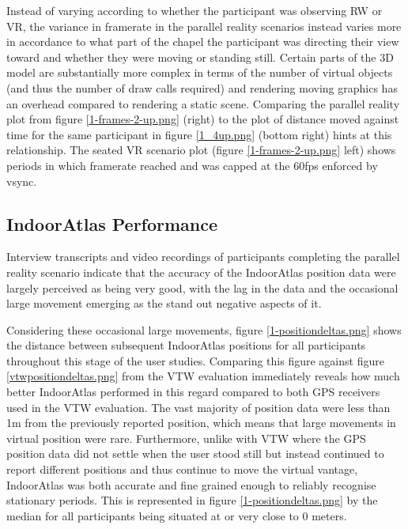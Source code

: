 \newpage

Instead of varying according to whether the participant was observing RW or VR, the variance in framerate in the parallel reality scenarios instead varies more in accordance to what part of the chapel the participant was directing their view toward and whether they were moving or standing still. Certain parts of the 3D model are substantially more complex in terms of the number of virtual objects (and thus the number of draw calls required) and rendering moving graphics has an overhead compared to rendering a static scene. Comparing the parallel reality plot from figure \ref{1-frames-2-up.png} (right) to the plot of distance moved against time for the same participant in figure \ref{1_4up.png} (bottom right) hints at this relationship. The seated VR scenario plot (figure \ref{1-frames-2-up.png} left) shows periods in which framerate reached and was capped at the 60fps enforced by vsync.


\subsection{IndoorAtlas Performance}

Interview transcripts and video recordings of participants completing the parallel reality scenario indicate that the accuracy of the IndoorAtlas position data were largely perceived as being very good, with the lag in the data and the occasional large movement emerging as the stand out negative aspects of it.

Considering these occasional large movements, figure \ref{1-positiondeltas.png} shows the distance between subsequent IndoorAtlas positions for all participants throughout this stage of the user studies. Comparing this figure against figure \ref{vtwpositiondeltas.png} from the VTW evaluation immediately reveals how much better IndoorAtlas performed in this regard compared to both GPS receivers used in the VTW evaluation. The vast majority of position data were less than 1m from the previously reported position, which means that large movements in virtual position were rare. Furthermore, unlike with VTW where the GPS position data did not settle when the user stood still but instead continued to report different positions and thus continue to move the virtual vantage, IndoorAtlas was both accurate and fine grained enough to reliably recognise stationary periods. This is represented in figure \ref{1-positiondeltas.png} by the median for all participants being situated at or very close to 0 meters.

